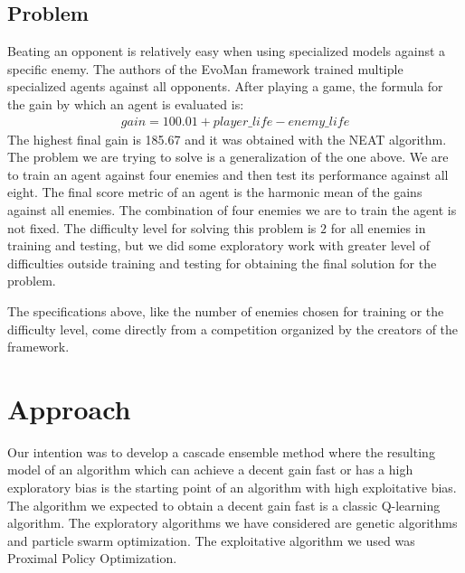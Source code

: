 \documentclass[conference]{IEEEtran}
\begin{document}
    \subsection{Problem}\label{subsec:problem}
    Beating an opponent is relatively easy when using specialized models against a specific enemy.
    The authors of the EvoMan framework trained multiple specialized agents against all opponents.
    After playing a game, the formula for the gain by which an agent is evaluated is:
    \boldmath
    \begin{gather*}
        gain = 100.01 + player\_life - enemy\_life
    \end{gather*}
    \unboldmath
    The highest final gain is 185.67\cite{evoman} and it was obtained with the NEAT\cite{neat} algorithm. \\

    The problem we are trying to solve is a generalization of the one above.
    We are to train an agent against four enemies and then test its performance against all eight.
    The final score metric of an agent is the harmonic mean of the gains against all enemies.
    The combination of four enemies we are to train the agent is not fixed.
    The difficulty level for solving this problem is $2$ for all enemies in training and testing,
    but we did some exploratory work with greater level of difficulties outside training and
    testing for obtaining the final solution for the problem.

    The specifications above, like the number of enemies chosen for training or the difficulty level,
    come directly from a competition organized by the creators of the framework\cite{evoman_competition}.


    \section{Approach}\label{sec:approach}
    Our intention was to develop a cascade ensemble method where the resulting model of an algorithm
    which can achieve a decent gain fast or has a high exploratory bias is the starting point of an algorithm with high exploitative bias.
    The algorithm we expected to obtain a decent gain fast is a classic Q-learning\cite{q_learning} algorithm. The exploratory algorithms we have considered are genetic algorithms\cite{genetic_algorithm} and particle swarm optimization\cite{pso}.
    The exploitative algorithm we used was Proximal Policy Optimization\cite{ppo}.
\end{document}
